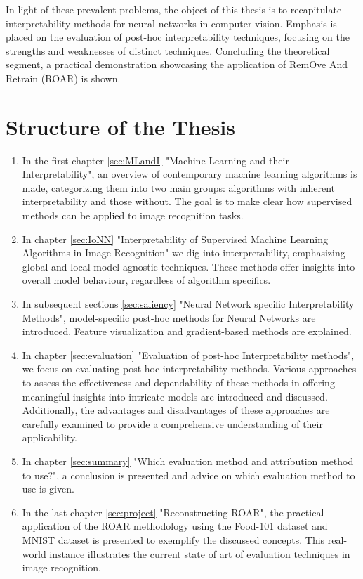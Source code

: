 In light of these prevalent problems, the object of this thesis is to recapitulate interpretability methods for neural networks in computer vision. Emphasis is placed on the evaluation of post-hoc interpretability techniques, focusing on the strengths and weaknesses of distinct techniques. Concluding the theoretical segment, a practical demonstration showcasing the application of RemOve And Retrain (ROAR) \cite{hooker2019benchmark} is shown. 

\section{Structure of the Thesis}

\begin{enumerate}
	\item In the first chapter \ref{sec:MLandI} "Machine Learning and their Interpretability", an overview of contemporary machine learning algorithms is made, categorizing them into two main groups: algorithms with inherent interpretability and those without. The goal is to make clear how supervised methods can be applied to image recognition tasks.
	\item In chapter \ref{sec:IoNN} "Interpretability of Supervised Machine Learning Algorithms in Image Recognition" we dig into interpretability, emphasizing global and local model-agnostic techniques. These methods offer insights into overall model behaviour, regardless of algorithm specifics. 
	\item In subsequent sections \ref{sec:saliency} "Neural Network specific Interpretability Methods", model-specific post-hoc methods for Neural Networks are introduced. Feature visualization and gradient-based methods are explained.
	\item In chapter \ref{sec:evaluation} "Evaluation of post-hoc Interpretability methods", we focus on evaluating post-hoc interpretability methods. Various approaches to assess the effectiveness and dependability of these methods in offering meaningful insights into intricate models are introduced and discussed. Additionally, the advantages and disadvantages of these approaches are carefully examined to provide a comprehensive understanding of their applicability.
	\item In chapter \ref{sec:summary} "Which evaluation method and attribution method to use?", a conclusion is presented and advice on which evaluation method to use is given. 
	\item In the last chapter \ref{sec:project} "Reconstructing ROAR", the practical application of the ROAR methodology using the Food-101 dataset \cite{bossard14} and MNIST dataset \cite{deng2012mnist} is presented to exemplify the discussed concepts. This real-world instance illustrates the current state of art of evaluation techniques in image recognition.
\end{enumerate}

